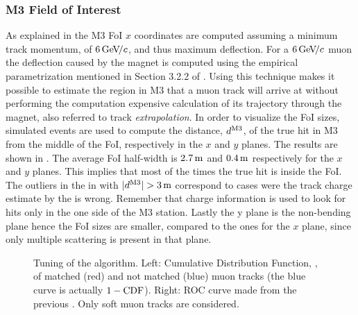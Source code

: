 \subsubsection{M3 Field of Interest}
As explained in  the M3 FoI $x$ coordinates are computed assuming a minimum track momentum, of $6{\mathrm{\,Ge\kern -0.1em V\!/}c}$,
and thus maximum deflection. For a $6{\mathrm{\,Ge\kern -0.1em V\!/}c}$ muon the deflection caused by the \lhcb magnet is computed using the empirical
parametrization mentioned in Section 3.2.2 of \cite{roelThesis}. Using this technique makes it possible to estimate the region
in M3 that a muon track will arrive at without performing the computation
expensive calculation of its trajectory through the \lhcb magnet, also referred to track {\it extrapolation}. In order to visualize the FoI sizes,
simulated events are used to compute the distance, $d^{\rm M3}$, of the true hit in M3 from the middle of the FoI, respectively in the $x$ and $y$ planes.
The results are shown in . The average FoI half-width is $2.7\rm \,m$ and $0.4\rm \,m$ respectively for the $x$ and $y$ planes.
This implies that most of the times the true hit is inside the FoI. The outliers in the  in with $|d^{\rm M3}|>3\m$
correspond to cases were the track charge estimate by the \ttracker is wrong. Remember that charge information is used to
look for hits only in the one side of the M3 station. Lastly the y plane is the non-bending plane hence the FoI sizes
are smaller, compared to the ones for the $x$ plane, since only multiple scattering is present in that plane.

\begin{figure}[t]
  \centering
  \begin{subfigure}{0.5\textwidth}
    \raggedright
    \scalebox{0.55}{}
    \caption{}
    \label{mvm_cdf}
  \end{subfigure}%
  \hfill%
  \begin{subfigure}{0.5\textwidth}
    \raggedleft
    \scalebox{0.55}{}
    \caption{}
    \label{mvm_roc}
  \end{subfigure}
  \caption{Tuning of the \mvTTm algorithm. Left: \chisq Cumulative Distribution Function, \cdf,
           of matched (red) and not matched (blue) muon tracks (the blue curve is actually $1-\mbox{CDF}$).
           Right: ROC curve made from the previous \chisq \cdf. Only soft muon tracks are considered. }
 \label{mvm_tuning}
\end{figure}

